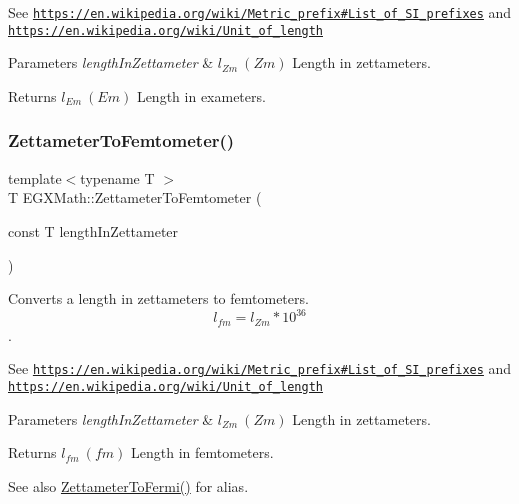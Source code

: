 See \href{https://en.wikipedia.org/wiki/Metric_prefix#List_of_SI_prefixes}{\tt https\+://en.\+wikipedia.\+org/wiki/\+Metric\+\_\+prefix\#\+List\+\_\+of\+\_\+\+S\+I\+\_\+prefixes} and \href{https://en.wikipedia.org/wiki/Unit_of_length}{\tt https\+://en.\+wikipedia.\+org/wiki/\+Unit\+\_\+of\+\_\+length} 
\begin{DoxyParams}{Parameters}
{\em length\+In\+Zettameter} & $ l_{Zm}\ (Zm)$ Length in zettameters. \\
\hline
\end{DoxyParams}
\begin{DoxyReturn}{Returns}
$ l_{Em}\ (Em)$ Length in exameters. 
\end{DoxyReturn}
\mbox{\label{group___e_g_x_math-_conversions-_length_conversions-_s_i-_zettameter-_s_i_ga9af7bed274fea1c279796cd6113e79c4}} 
\subsubsection{\texorpdfstring{Zettameter\+To\+Femtometer()}{ZettameterToFemtometer()}}
{\footnotesize\ttfamily template$<$typename T $>$ \\
T E\+G\+X\+Math\+::\+Zettameter\+To\+Femtometer (\begin{DoxyParamCaption}\item[{const T}]{length\+In\+Zettameter }\end{DoxyParamCaption})}



Converts a length in zettameters to femtometers. \[ l_{fm}=l_{Zm} * 10^{36} \]. 

See \href{https://en.wikipedia.org/wiki/Metric_prefix#List_of_SI_prefixes}{\tt https\+://en.\+wikipedia.\+org/wiki/\+Metric\+\_\+prefix\#\+List\+\_\+of\+\_\+\+S\+I\+\_\+prefixes} and \href{https://en.wikipedia.org/wiki/Unit_of_length}{\tt https\+://en.\+wikipedia.\+org/wiki/\+Unit\+\_\+of\+\_\+length} 
\begin{DoxyParams}{Parameters}
{\em length\+In\+Zettameter} & $ l_{Zm}\ (Zm)$ Length in zettameters. \\
\hline
\end{DoxyParams}
\begin{DoxyReturn}{Returns}
$ l_{fm}\ (fm)$ Length in femtometers. 
\end{DoxyReturn}
\begin{DoxySeeAlso}{See also}
\mbox{\hyperlink{group___e_g_x_math-_conversions-_length_conversions-_s_i-_zettameter-_non-_s_i_ga791b0a401fe813fe4e6a34490f12a817}{Zettameter\+To\+Fermi()}} for alias. 
\end{DoxySeeAlso}
\mbox{\label{group___e_g_x_math-_conversions-_length_conversions-_s_i-_zettameter-_s_i_gab6673b4fa72a1c196d7fba1260e7f78a}} 
